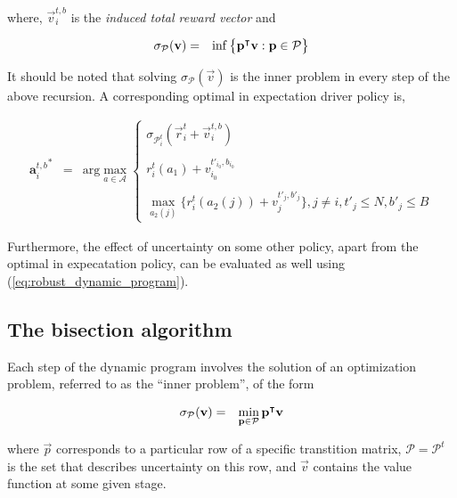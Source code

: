 where, $\vec{v}_{i}^{t,b}$ is the \textit{induced total reward vector} and 

\begin{eqnarray*}
\sigma_{\mathcal{P}}(\mathbf{v}) &=& \inf\big\{ \mathbf{p}^\intercal\mathbf{v}: \mathbf{p} \in \mathcal{P} \big\}
\end{eqnarray*}

It should be noted that solving $\sigma_{\mathcal{P}}(\vec{v})$ is the inner problem in every step of the above recursion. A corresponding optimal in expectation driver policy is,

\begin{eqnarray}
{\textbf{a}_{i}^{t,b}}^* &=& \textrm{arg}\max_{a \in \mathcal{A}}
    \begin{cases}
    \sigma_{\mathcal{P}_{i}^{t}}(\vec{r}_{i}^{t} + \vec{v}_{i}^{t,b})\\ \\
    r_{i}^{t}(a_1) + v_{i_0}^{t'_{i_0},b_{i_0}} \\ \\
    \max_{a_2(j)} \bigg\{r_{i}^{t}(a_2(j)) + v_{j}^{t'_{j},b'_{j}}\bigg\}, j \neq i, t'_{j} \leq N, b'_{j} \leq B
    \end{cases}
\end{eqnarray}

Furthermore, the effect of uncertainty on some other policy, apart from the optimal in expecatation policy, can be evaluated as well using (\ref{eq:robust_dynamic_program}).

\subsection{The bisection algorithm}

Each step of the dynamic program involves the solution of an optimization problem, referred to as the ``inner problem'', of the form

\begin{eqnarray}
\sigma_{\mathcal{P}}(\mathbf{v}) &=& \min_{\mathbf{p} \in \mathcal{P}} \mathbf{p}^\intercal\mathbf{v}
\label{eq:inner_problem}
\end{eqnarray}

where $\vec{p}$ corresponds to a particular row of a specific transtition matrix, $\mathcal{P} = \mathcal{P}^t$ is the set that describes uncertainty on this row, and $\vec{v}$ contains the value function at some given stage. 


